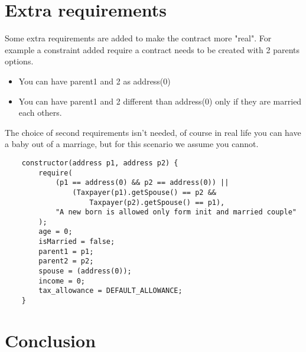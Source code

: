 \documentclass{article}
\begin{document}
\section{Extra requirements}
Some extra requirements are added to make the contract more "real".
For example a constraint added require a contract needs to be created with 2 parents options.
\begin{itemize}
    \small
    \item You can have parent1 and 2 as address(0)
    \item You can have parent1 and 2 different than address(0) only if they are married each others.
\end{itemize}
The choice of second requirements isn't needed, of course in real life you can have a baby out of a marriage, but for this scenario we assume you cannot.
\begin{verbatim}
    constructor(address p1, address p2) {
        require(
            (p1 == address(0) && p2 == address(0)) ||
                (Taxpayer(p1).getSpouse() == p2 &&
                    Taxpayer(p2).getSpouse() == p1),
            "A new born is allowed only form init and married couple"
        );
        age = 0;
        isMarried = false;
        parent1 = p1;
        parent2 = p2;
        spouse = (address(0));
        income = 0;
        tax_allowance = DEFAULT_ALLOWANCE;
    }
    \end{verbatim}
    
\section{Conclusion}
    \lipsum[6]  %

\printbibliography
\end{document}
